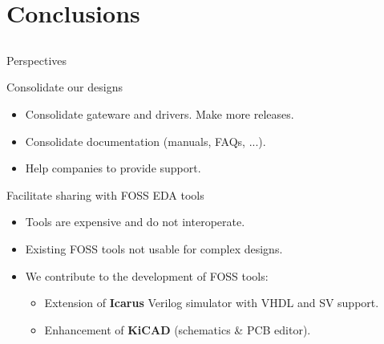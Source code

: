\documentclass[compress,red]{beamer}
\begin{document}
\section{Conclusions}

\subsection*{} %

\begin{frame}{Perspectives}

  \begin{block}{Consolidate our designs}
    \begin{itemize}
    \item Consolidate gateware and drivers. Make more releases.
    \item Consolidate documentation (manuals, FAQs, ...).
    \item Help companies to provide support.
    \end{itemize}
  \end{block}

  \pause
  \begin{block}{Facilitate sharing with FOSS EDA tools}
    \begin{itemize}
    \item Tools are expensive and do not interoperate.
    \item Existing FOSS tools not usable for complex designs.
    \item We contribute to the development of FOSS tools:
      \begin{itemize}
      \item Extension of \textbf{Icarus} Verilog simulator with VHDL and SV support. %
      \item Enhancement of \textbf{KiCAD} (schematics \& PCB editor).
      \end{itemize}
    \end{itemize}
  \end{block}

  \note[item]{}

\end{frame}
\end{document}
